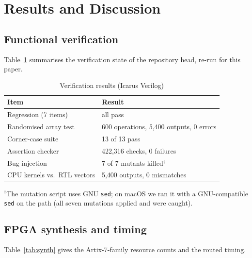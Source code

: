 \documentclass[conference]{IEEEtran}
\begin{document}
\section{Results and Discussion}
\subsection{Functional verification}
Table~\ref{tab:verif} summarises the verification state of the repository head, re-run for this paper.

\begin{table}[!t]
\caption{Verification results (Icarus Verilog)}
\label{tab:verif}
\centering\footnotesize
\begin{tabular}{@{}p{}p{}@{}}
\toprule
Item & Result \\
\midrule
Regression (7 items) & all pass \\
Randomised array test & 600 operations, 5,400 outputs, 0 errors \\
Corner-case suite & 13 of 13 pass \\
Assertion checker & 422,316 checks, 0 failures \\
Bug injection & 7 of 7 mutants killed$^{\dagger}$ \\
CPU kernels vs.\ RTL vectors & 5,400 outputs, 0 mismatches \\
\bottomrule
\end{tabular}

\vspace{2pt}\raggedright\scriptsize $^{\dagger}$The mutation script uses GNU \texttt{sed}; on macOS we ran it with a GNU-compatible \texttt{sed} on the path (all seven mutations applied and were caught).
\end{table}

\subsection{FPGA synthesis and timing}
\label{sec:synth}
Table~\ref{tab:synth} gives the Artix-7-family resource counts and the routed timing.
\end{document}
